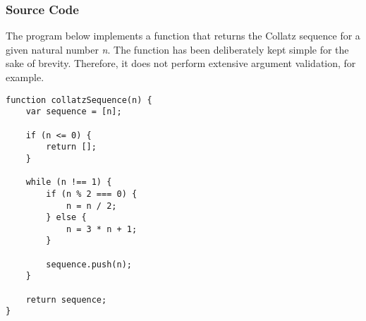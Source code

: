 \subsubsection{Source Code}

The program below implements a function that returns the Collatz sequence for a given natural number \emph{n}. The  function has been deliberately kept simple for the sake of brevity. Therefore, it does not perform extensive argument validation, for example.

\vspace{0.15cm}

\begin{verbatim}
function collatzSequence(n) {
    var sequence = [n];

    if (n <= 0) {
        return [];
    }

    while (n !== 1) {
        if (n % 2 === 0) {
            n = n / 2;
        } else {
            n = 3 * n + 1;
        }

        sequence.push(n);
    }

    return sequence;
}
\end{verbatim}
